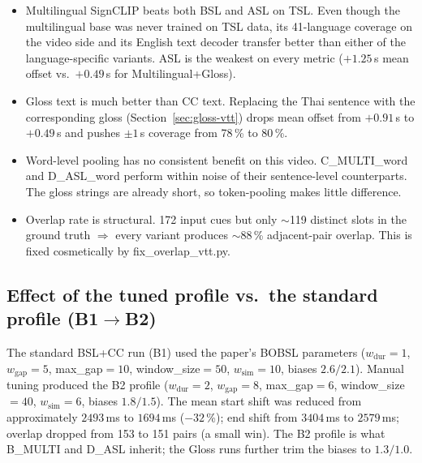 \documentclass[11pt,a4paper]{article}
\def\texttt#1{#1}%
\def\textbf#1{#1}%
\begin{document}
\begin{itemize}[leftmargin=1.5em]
  \item \textbf{Multilingual SignCLIP beats both BSL and ASL on TSL.} Even
        though the multilingual base was never trained on TSL data, its
        41-language coverage on the video side and its English text decoder
        transfer better than either of the language-specific variants. ASL
        is the weakest on every metric ($+1.25$\,s mean offset vs.\
        $+0.49$\,s for Multilingual+Gloss).
  \item \textbf{Gloss text is much better than CC text.} Replacing the Thai
        sentence with the corresponding gloss (Section~\ref{sec:gloss-vtt})
        drops mean offset from $+0.91$\,s to $+0.49$\,s and pushes
        $\pm 1$\,s coverage from 78\,\% to 80\,\%.
  \item \textbf{Word-level pooling has no consistent benefit on this video.}
        \texttt{C\_MULTI\_word} and \texttt{D\_ASL\_word} perform within
        noise of their sentence-level counterparts. The gloss strings are
        already short, so token-pooling makes little difference.
  \item \textbf{Overlap rate is structural.} 172 input cues but only $\sim$119
        distinct slots in the ground truth $\Rightarrow$ every variant
        produces $\sim$88\,\% adjacent-pair overlap. This is fixed
        cosmetically by \texttt{fix\_overlap\_vtt.py}.
\end{itemize}

\subsection{Effect of the tuned profile vs.\ the standard profile (B1$\to$B2)}
The standard BSL+CC run (B1) used the paper's BOBSL parameters
($w_{\mathrm{dur}}{=}1$, $w_{\mathrm{gap}}{=}5$, \texttt{max\_gap}${=}10$,
\texttt{window\_size}${=}50$, $w_{\mathrm{sim}}{=}10$, biases
$2.6/2.1$). Manual tuning produced the B2 profile
($w_{\mathrm{dur}}{=}2$, $w_{\mathrm{gap}}{=}8$, \texttt{max\_gap}${=}6$,
\texttt{window\_size}${=}40$, $w_{\mathrm{sim}}{=}6$, biases $1.8/1.5$).
The mean start shift was reduced from approximately $2493$\,ms to $1694$\,ms
($-32$\,\%); end shift from $3404$\,ms to $2579$\,ms; overlap dropped from
153 to 151 pairs (a small win). The B2 profile is what
\texttt{B\_MULTI} and \texttt{D\_ASL} inherit; the Gloss runs further
trim the biases to $1.3/1.0$.
\end{document}
